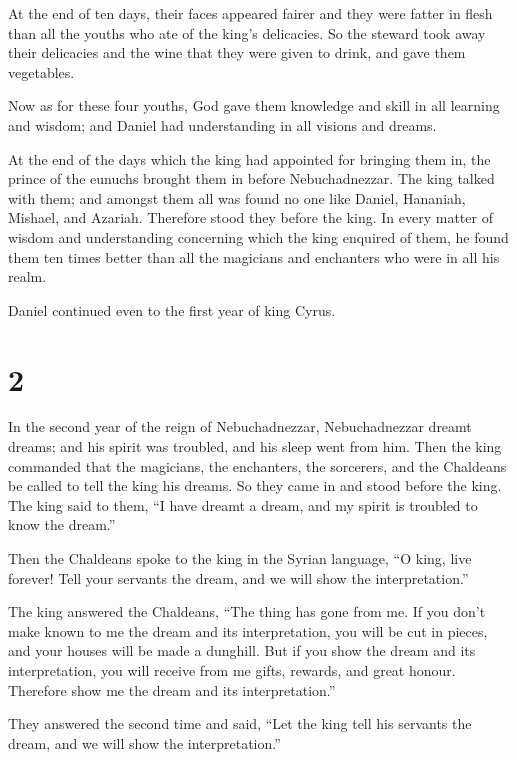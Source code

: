  At the end of ten days, their faces appeared fairer and
they were fatter in flesh than all the youths who ate of the king's
delicacies.  So the steward took away their delicacies and
the wine that they were given to drink, and gave them vegetables.

 Now as for these four youths, God gave them knowledge and
skill in all learning and wisdom; and Daniel had understanding in all
visions and dreams.

 At the end of the days which the king had appointed for
bringing them in, the prince of the eunuchs brought them in before
Nebuchadnezzar.  The king talked with them; and amongst
them all was found no one like Daniel, Hananiah, Mishael, and Azariah.
Therefore stood they before the king.  In every matter of
wisdom and understanding concerning which the king enquired of them, he
found them ten times better than all the magicians and enchanters who
were in all his realm.

 Daniel continued even to the first year of king Cyrus.

\hypertarget{section-1}{%
\section{2}\label{section-1}}

 In the second year of the reign of Nebuchadnezzar,
Nebuchadnezzar dreamt dreams; and his spirit was troubled, and his sleep
went from him.  Then the king commanded that the magicians,
the enchanters, the sorcerers, and the Chaldeans be called to tell the
king his dreams. So they came in and stood before the king. 
The king said to them, ``I have dreamt a dream, and my spirit is
troubled to know the dream.''

 Then the Chaldeans spoke to the king in the Syrian
language, ``O king, live forever! Tell your servants the dream, and we
will show the interpretation.''

 The king answered the Chaldeans, ``The thing has gone from
me. If you don't make known to me the dream and its interpretation, you
will be cut in pieces, and your houses will be made a dunghill.
 But if you show the dream and its interpretation, you will
receive from me gifts, rewards, and great honour. Therefore show me the
dream and its interpretation.''

 They answered the second time and said, ``Let the king tell
his servants the dream, and we will show the interpretation.''


